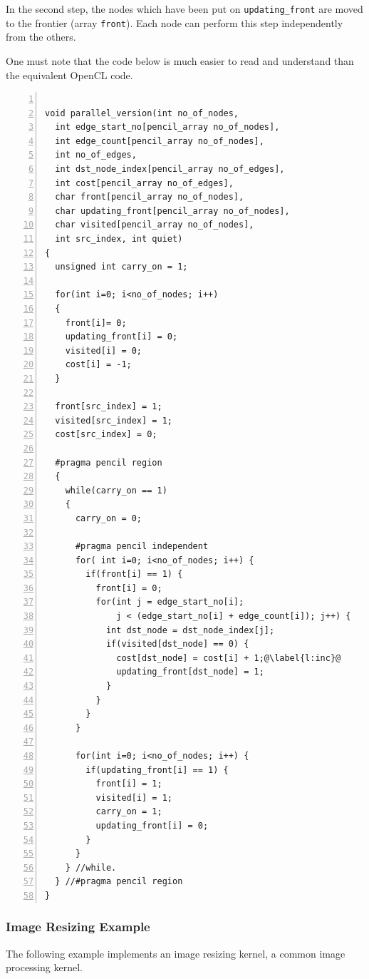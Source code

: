 In the second step, the nodes which have been put on \lstinline!updating_front!
are moved to the frontier (array \lstinline!front!).  Each node can perform
this step independently from the others.

One must note that the \pencil code below is much easier to read and understand
than the equivalent OpenCL code.


\begin{lstlisting}[language=pencil,escapechar=@, numbers=left,numberstyle={\tiny\tt},numbersep=5pt]

void parallel_version(int no_of_nodes,
  int edge_start_no[pencil_array no_of_nodes],
  int edge_count[pencil_array no_of_nodes],
  int no_of_edges,
  int dst_node_index[pencil_array no_of_edges],
  int cost[pencil_array no_of_edges],
  char front[pencil_array no_of_nodes],
  char updating_front[pencil_array no_of_nodes],
  char visited[pencil_array no_of_nodes],
  int src_index, int quiet)
{
  unsigned int carry_on = 1;

  for(int i=0; i<no_of_nodes; i++)
  {
    front[i]= 0;
    updating_front[i] = 0;
    visited[i] = 0;
    cost[i] = -1;
  }

  front[src_index] = 1;
  visited[src_index] = 1;
  cost[src_index] = 0;

  #pragma pencil region
  {
    while(carry_on == 1)
    {
      carry_on = 0;

      #pragma pencil independent
      for( int i=0; i<no_of_nodes; i++) {
        if(front[i] == 1) {
          front[i] = 0; 
          for(int j = edge_start_no[i]; 
              j < (edge_start_no[i] + edge_count[i]); j++) {
            int dst_node = dst_node_index[j];
            if(visited[dst_node] == 0) {
              cost[dst_node] = cost[i] + 1;@\label{l:inc}@
              updating_front[dst_node] = 1;
            }
          }
        }
      }

      for(int i=0; i<no_of_nodes; i++) {
        if(updating_front[i] == 1) {
          front[i] = 1;
          visited[i] = 1;
          carry_on = 1;
          updating_front[i] = 0;
        }
      }  
    } //while.
  } //#pragma pencil region
}
\end{lstlisting}

\subsubsection{Image Resizing Example}

The following example implements an image resizing kernel,
a common image processing kernel.

